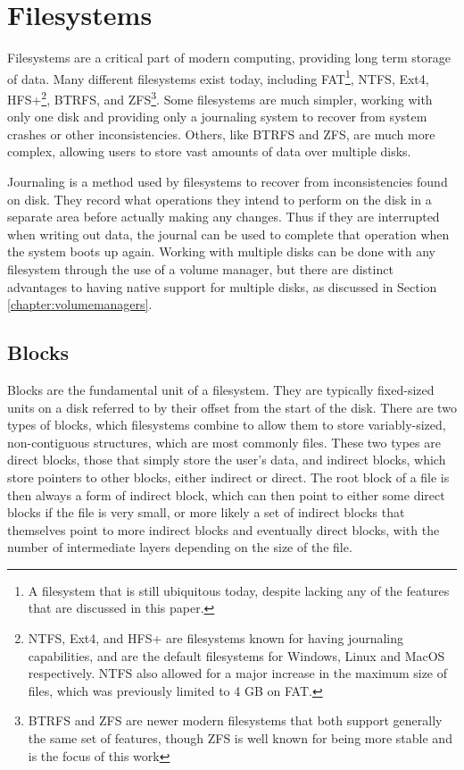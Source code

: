 \chapter{Filesystems}
Filesystems are a critical part of modern computing, providing long term storage of data.
Many different filesystems exist today, including FAT\footnote{A filesystem that is still ubiquitous today, 
despite lacking any of the features that are discussed in this paper.},
NTFS, Ext4, HFS+\footnote{NTFS, Ext4, and HFS+ are filesystems known for having journaling capabilities, 
and are the default filesystems for Windows, Linux and MacOS respectively.
NTFS also allowed for a major increase in the maximum size of files, which was previously limited to 4 GB on FAT.}, 
BTRFS, and ZFS\footnote{BTRFS and ZFS are newer modern filesystems that both support generally the same set of features,
though ZFS is well known for being more stable and is the focus of this work}.
Some filesystems are much simpler, working with only one disk and providing only a journaling system to recover from system crashes
or other inconsistencies.
Others, like BTRFS and ZFS, are much more complex, allowing users to store vast amounts of data over multiple disks.

Journaling is a method used by filesystems to recover from inconsistencies found on disk.
They record what operations they intend to perform on the disk in a separate area before actually making any changes.
Thus if they are interrupted when writing out data, the journal can be used to complete that operation when the system boots up again.
Working with multiple disks can be done with any filesystem through the use of a volume manager,
but there are distinct advantages to having native support for multiple disks, as discussed in Section \ref{chapter:volumemanagers}.

\section{Blocks}
\label{chapter:blocks}
Blocks are the fundamental unit of a filesystem.
They are typically fixed-sized units on a disk referred to by their offset from the start of the disk.
There are two types of blocks, which filesystems combine to allow them to store variably-sized, non-contiguous structures,
which are most commonly files.
These two types are direct blocks, those that simply store the user's data, and indirect blocks, which store pointers to other blocks,
either indirect or direct.
The root block of a file is then always a form of indirect block, which can then point to either some direct blocks if the file is very small,
or more likely a set of indirect blocks that themselves point to more indirect blocks and eventually direct blocks,
with the number of intermediate layers depending on the size of the file.

